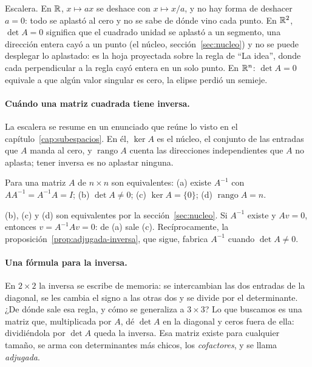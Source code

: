 Escalera. En \(\mathbb{R}\), \(x\mapsto ax\) se deshace con \(x\mapsto x/a\), y no hay forma de
deshacer \(a=0\): todo se aplastó al cero y no se sabe de dónde vino cada punto. En
\(\mathbb{R}^2\), \(\det A=0\) significa que el cuadrado unidad se aplastó a un segmento, una
dirección entera cayó a un punto (el núcleo, sección~\ref{sec:nucleo}) y no se puede
desplegar lo aplastado: es la hoja proyectada sobre la regla de \enquote{La idea}, donde cada
perpendicular a la regla cayó entera en un solo punto. En \(\mathbb{R}^n\): \(\det A=0\) equivale a
que algún valor singular es cero, la elipse perdió un semieje.

\paragraph{Cuándo una matriz cuadrada tiene inversa.} La escalera se resume en un enunciado que
reúne lo visto en el capítulo~\ref{cap:subespacios}. En él, \(\ker A\) es el núcleo, el
conjunto de las entradas que \(A\) manda al cero, y \(\operatorname{rango}A\) cuenta las
direcciones independientes que \(A\) no aplasta; tener inversa es no aplastar ninguna.

\begin{proposicion}\label{prop:inversa-existe}
Para una matriz \(A\) de \(n\times n\) son equivalentes: (a) existe \(A^{-1}\) con
\(AA^{-1}=A^{-1}A=I\); (b) \(\det A\neq0\); (c) \(\ker A=\{0\}\); (d)
\(\operatorname{rango}A=n\).
\end{proposicion}

\begin{demostracion}
(b), (c) y (d) son equivalentes por la sección~\ref{sec:nucleo}. Si \(A^{-1}\) existe y
\(Av=0\), entonces \(v=A^{-1}Av=0\): de (a) sale (c). Recíprocamente, la proposición~\ref{prop:adjugada-inversa}, que
sigue, fabrica \(A^{-1}\) cuando \(\det A\neq0\).
\end{demostracion}

\paragraph{Una fórmula para la inversa.} En \(2\times2\) la inversa se escribe de memoria: se
intercambian las dos entradas de la diagonal, se les cambia el signo a las otras dos y se
divide por el determinante. ¿De dónde sale esa regla, y cómo se generaliza a \(3\times3\)? Lo
que buscamos es una matriz que, multiplicada por \(A\), dé \(\det A\) en la diagonal y ceros
fuera de ella: dividiéndola por \(\det A\) queda la inversa. Esa matriz existe para cualquier
tamaño, se arma con determinantes más chicos, los \emph{cofactores}, y se llama
\emph{adjugada}.

